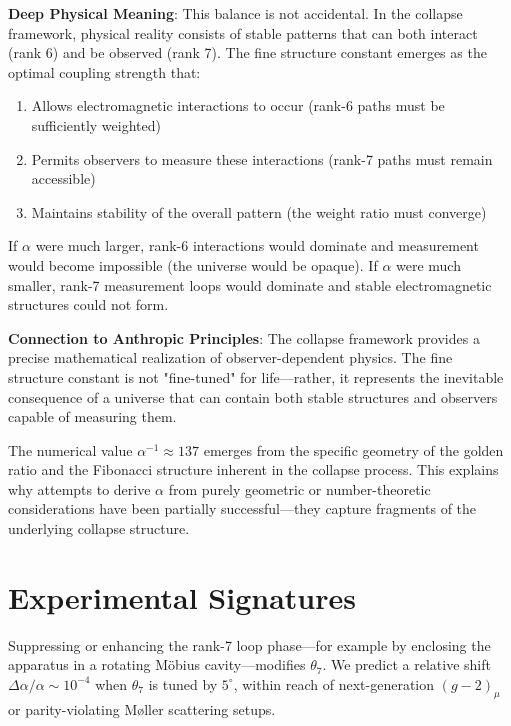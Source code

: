 \documentclass[%
 reprint,
 amsmath,amssymb,
 aps,
 prd,
 nofootinbib,      %
 longbibliography  %
]{revtex4-2}
\begin{document}
\textbf{Deep Physical Meaning}: This balance is not accidental. In the collapse framework, physical reality consists of stable patterns that can both interact (rank 6) and be observed (rank 7). The fine structure constant emerges as the optimal coupling strength that:

\begin{enumerate}
\item Allows electromagnetic interactions to occur (rank-6 paths must be sufficiently weighted)
\item Permits observers to measure these interactions (rank-7 paths must remain accessible)
\item Maintains stability of the overall pattern (the weight ratio must converge)
\end{enumerate}

If $\alpha$ were much larger, rank-6 interactions would dominate and measurement would become impossible (the universe would be opaque). If $\alpha$ were much smaller, rank-7 measurement loops would dominate and stable electromagnetic structures could not form.

\textbf{Connection to Anthropic Principles}: The collapse framework provides a precise mathematical realization of observer-dependent physics. The fine structure constant is not "fine-tuned" for life—rather, it represents the inevitable consequence of a universe that can contain both stable structures and observers capable of measuring them.

The numerical value $\alpha^{-1} \approx 137$ emerges from the specific geometry of the golden ratio and the Fibonacci structure inherent in the collapse process. This explains why attempts to derive $\alpha$ from purely geometric or number-theoretic considerations have been partially successful—they capture fragments of the underlying collapse structure.

\section{Experimental Signatures}\label{sec:exp}

Suppressing or enhancing the
rank-7 loop phase---for example by enclosing the apparatus
in a rotating Möbius cavity---modifies $\theta_7$.
We predict a relative shift
\(\Delta\alpha/\alpha\sim10^{-4}\)
when \(\theta_7\) is tuned by $5^\circ$,
within reach of next-generation
$(g-2)_\mu$ or parity-violating Møller scattering setups.
\end{document}
